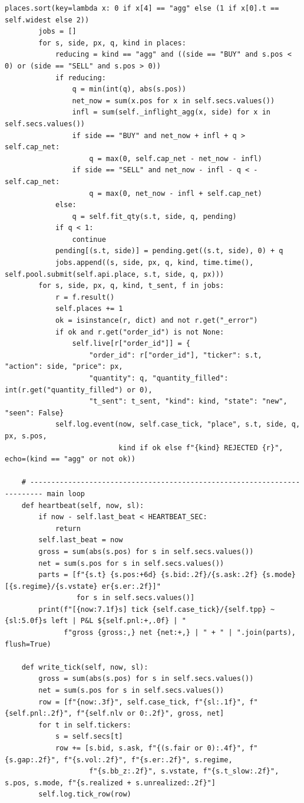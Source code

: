 \begin{lstlisting}[style=algocode]
        places.sort(key=lambda x: 0 if x[4] == "agg" else (1 if x[0].t == self.widest else 2))
        jobs = []
        for s, side, px, q, kind in places:
            reducing = kind == "agg" and ((side == "BUY" and s.pos < 0) or (side == "SELL" and s.pos > 0))
            if reducing:
                q = min(int(q), abs(s.pos))
                net_now = sum(x.pos for x in self.secs.values())
                infl = sum(self._inflight_agg(x, side) for x in self.secs.values())
                if side == "BUY" and net_now + infl + q > self.cap_net:
                    q = max(0, self.cap_net - net_now - infl)
                if side == "SELL" and net_now - infl - q < -self.cap_net:
                    q = max(0, net_now - infl + self.cap_net)
            else:
                q = self.fit_qty(s.t, side, q, pending)
            if q < 1:
                continue
            pending[(s.t, side)] = pending.get((s.t, side), 0) + q
            jobs.append((s, side, px, q, kind, time.time(), self.pool.submit(self.api.place, s.t, side, q, px)))
        for s, side, px, q, kind, t_sent, f in jobs:
            r = f.result()
            self.places += 1
            ok = isinstance(r, dict) and not r.get("_error")
            if ok and r.get("order_id") is not None:
                self.live[r["order_id"]] = {
                    "order_id": r["order_id"], "ticker": s.t, "action": side, "price": px,
                    "quantity": q, "quantity_filled": int(r.get("quantity_filled") or 0),
                    "t_sent": t_sent, "kind": kind, "state": "new", "seen": False}
            self.log.event(now, self.case_tick, "place", s.t, side, q, px, s.pos,
                           kind if ok else f"{kind} REJECTED {r}", echo=(kind == "agg" or not ok))

    # ------------------------------------------------------------------------- main loop
    def heartbeat(self, now, sl):
        if now - self.last_beat < HEARTBEAT_SEC:
            return
        self.last_beat = now
        gross = sum(abs(s.pos) for s in self.secs.values())
        net = sum(s.pos for s in self.secs.values())
        parts = [f"{s.t} {s.pos:+6d} {s.bid:.2f}/{s.ask:.2f} {s.mode} [{s.regime}/{s.vstate} er{s.er:.2f}]"
                 for s in self.secs.values()]
        print(f"[{now:7.1f}s] tick {self.case_tick}/{self.tpp} ~{sl:5.0f}s left | P&L ${self.pnl:+,.0f} | "
              f"gross {gross:,} net {net:+,} | " + " | ".join(parts), flush=True)

    def write_tick(self, now, sl):
        gross = sum(abs(s.pos) for s in self.secs.values())
        net = sum(s.pos for s in self.secs.values())
        row = [f"{now:.3f}", self.case_tick, f"{sl:.1f}", f"{self.pnl:.2f}", f"{self.nlv or 0:.2f}", gross, net]
        for t in self.tickers:
            s = self.secs[t]
            row += [s.bid, s.ask, f"{(s.fair or 0):.4f}", f"{s.gap:.2f}", f"{s.vol:.2f}", f"{s.er:.2f}", s.regime,
                    f"{s.bb_z:.2f}", s.vstate, f"{s.t_slow:.2f}", s.pos, s.mode, f"{s.realized + s.unrealized:.2f}"]
        self.log.tick_row(row)


\end{lstlisting}
